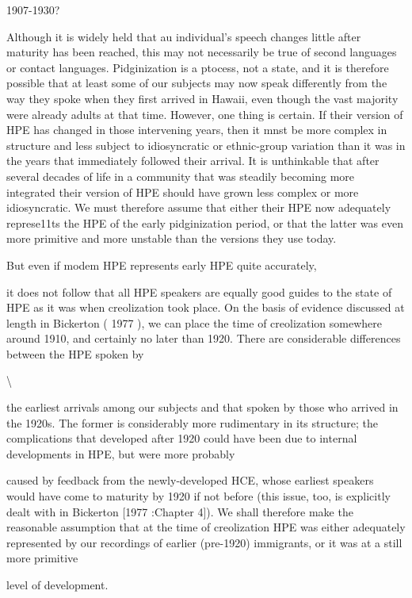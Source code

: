 1907-1930?

Although it is widely held that au individual's speech changes little after maturity has been reached, this may not necessarily be true of second languages or contact languages. Pidginization is a ptocess, not a state, and it is therefore possible that at least some of our subjects may now speak differently from the way they spoke when they first arrived in Hawaii, even though the vast majority were already adults at that time. However, one thing is certain. If their version of HPE has changed in those intervening years, then it mnst be more complex in structure and less subject to idiosyncratic or ethnic-group variation than it was in the years that immediately followed their arrival. It is unthinkable that after several decades of life in a community that was steadily becoming more integrated their version of HPE should have grown less complex or more idiosyncratic. We must therefore assume that either their HPE now adequately represe11ts the HPE of the early pidginization period, or that the latter was even more primitive and more unstable than the versions they use today.

But even if modem HPE represents early HPE quite accurately,

it does not follow that all HPE speakers are equally good guides to the state of HPE as it was when creolization took place. On the basis of evidence discussed at length in Bickerton ( 1977 ), we can place the time of creolization somewhere around 1910, and certainly no later than 1920. There are considerable differences between the HPE spoken by

{\textbackslash}

the earliest arrivals among our subjects and that spoken by those who arrived in the 1920s. The former is considerably more rudimentary in its structure; the complications that developed after 1920 could have been due to internal developments in HPE, but were more probably

caused by feedback from the newly-developed HCE, whose earliest speakers would have come to maturity by 1920 if not before (this issue, too, is explicitly dealt with in Bickerton [1977 :Chapter 4]). We shall therefore make the reasonable assumption that at the time of creolization HPE was either adequately represented by our recordings of earlier (pre-1920) immigrants, or it was at a still more primitive

level of development.


